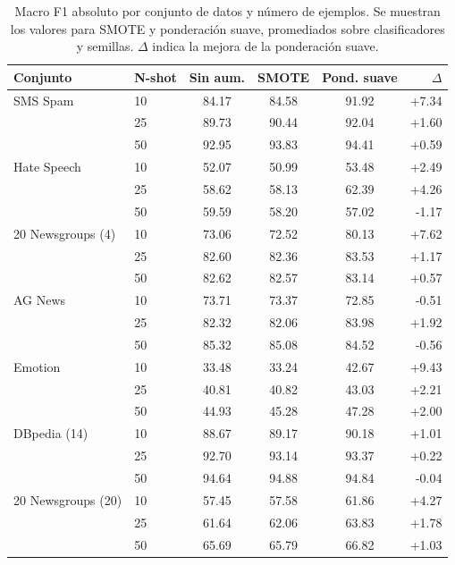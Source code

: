 \begin{table}[htbp]
\centering
\small
\caption{Macro F1 absoluto por conjunto de datos y número de ejemplos. Se muestran los valores para SMOTE y ponderación suave, promediados sobre clasificadores y semillas. $\Delta$ indica la mejora de la ponderación suave.}
\label{tab:absolute_f1_by_dataset}
\begin{tabular}{llcccr}
\toprule
\textbf{Conjunto} & \textbf{N-shot} & \textbf{Sin aum.} & \textbf{SMOTE} & \textbf{Pond. suave} & \textbf{$\Delta$} \\
\midrule
SMS Spam & 10 & 84.17 & 84.58 & 91.92 & +7.34 \\
 & 25 & 89.73 & 90.44 & 92.04 & +1.60 \\
 & 50 & 92.95 & 93.83 & 94.41 & +0.59 \\
\midrule
Hate Speech & 10 & 52.07 & 50.99 & 53.48 & +2.49 \\
 & 25 & 58.62 & 58.13 & 62.39 & +4.26 \\
 & 50 & 59.59 & 58.20 & 57.02 & -1.17 \\
\midrule
20 Newsgroups (4) & 10 & 73.06 & 72.52 & 80.13 & +7.62 \\
 & 25 & 82.60 & 82.36 & 83.53 & +1.17 \\
 & 50 & 82.62 & 82.57 & 83.14 & +0.57 \\
\midrule
AG News & 10 & 73.71 & 73.37 & 72.85 & -0.51 \\
 & 25 & 82.32 & 82.06 & 83.98 & +1.92 \\
 & 50 & 85.32 & 85.08 & 84.52 & -0.56 \\
\midrule
Emotion & 10 & 33.48 & 33.24 & 42.67 & +9.43 \\
 & 25 & 40.81 & 40.82 & 43.03 & +2.21 \\
 & 50 & 44.93 & 45.28 & 47.28 & +2.00 \\
\midrule
DBpedia (14) & 10 & 88.67 & 89.17 & 90.18 & +1.01 \\
 & 25 & 92.70 & 93.14 & 93.37 & +0.22 \\
 & 50 & 94.64 & 94.88 & 94.84 & -0.04 \\
\midrule
20 Newsgroups (20) & 10 & 57.45 & 57.58 & 61.86 & +4.27 \\
 & 25 & 61.64 & 62.06 & 63.83 & +1.78 \\
 & 50 & 65.69 & 65.79 & 66.82 & +1.03 \\
\bottomrule
\end{tabular}
\end{table}